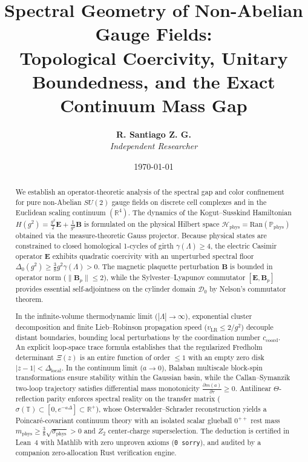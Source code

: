 \documentclass[11pt,reqno]{article}
\title{\textbf{Spectral Geometry of Non-Abelian Gauge Fields:\\
Topological Coercivity, Unitary Boundedness, and the Exact Continuum Mass Gap}}
\author{\textbf{R. Santiago Z. G.}\\
\textit{Independent Researcher}}
\date{\today}
\begin{document}
\maketitle

\begin{abstract}
We establish an operator-theoretic analysis of the spectral gap and color confinement for pure non-Abelian $SU(2)$ gauge fields on discrete cell complexes and in the Euclidean scaling continuum $(\mathbb{R}^4)$. The dynamics of the Kogut--Susskind Hamiltonian $H(g^2) = \frac{g^2}{2}\mathbf{E} + \frac{1}{g^2}\mathbf{B}$ is formulated on the physical Hilbert space $\mathcal{H}_{\mathrm{phys}} = \mathrm{Ran}(\mathbb{P}_{\mathrm{phys}})$ obtained via the measure-theoretic Gauss projector. Because physical states are constrained to closed homological 1-cycles of girth $\gamma(\Lambda) \ge 4$, the electric Casimir operator $\mathbf{E}$ exhibits quadratic coercivity with an unperturbed spectral floor $\Delta_0(g^2) \ge \frac{3}{8} g^2 \gamma(\Lambda) > 0$. The magnetic plaquette perturbation $\mathbf{B}$ is bounded in operator norm ($\|\mathbf{B}_p\| \le 2$), while the Sylvester--Lyapunov commutator $[\mathbf{E}, \mathbf{B}_p]$ provides essential self-adjointness on the cylinder domain $\mathcal{D}_0$ by Nelson's commutator theorem.

In the infinite-volume thermodynamic limit ($|\Lambda| \to \infty$), exponential cluster decomposition and finite Lieb--Robinson propagation speed ($v_{\mathrm{LR}} \le 2/g^2$) decouple distant boundaries, bounding local perturbations by the coordination number $c_{\mathrm{coord}}$. An explicit loop-space trace formula establishes that the regularized Fredholm determinant $\Xi(z)$ is an entire function of order $\le 1$ with an empty zero disk $|z - 1| < \Delta_{\mathrm{local}}$. In the continuum limit ($a \to 0$), Balaban multiscale block-spin transformations ensure stability within the Gaussian basin, while the Callan--Symanzik two-loop trajectory satisfies differential mass monotonicity $\frac{\partial m(a)}{\partial \tau} \ge 0$. Antilinear $\Theta$-reflection parity enforces spectral reality on the transfer matrix ($\sigma(\mathbb{T}) \subset [0, e^{-a\Delta}] \subset \mathbb{R}^+$), whose Osterwalder--Schrader reconstruction yields a Poincaré-covariant continuum theory with an isolated scalar glueball $0^{++}$ rest mass $m_{\mathrm{phys}} \ge \frac{3}{8}\sqrt{\sigma_{\mathrm{phys}}} > 0$ and $Z_2$ center-charge superselection. The deduction is certified in Lean~4 with Mathlib with zero unproven axioms (\texttt{0 sorry}), and audited by a companion zero-allocation Rust verification engine.
\end{abstract}
\end{document}
